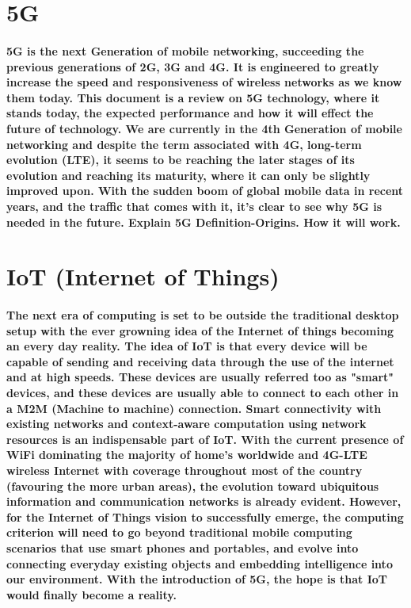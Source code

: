 \section{5G}
\paragraph{5G is the next Generation of mobile networking, succeeding the previous generations of 2G, 3G and 4G. It is engineered to greatly increase the speed and responsiveness of wireless networks as we know them today. This document is a review on 5G technology, where it stands today, the expected performance and how it will effect the future of technology. We are currently in the 4th Generation of mobile networking and despite the term associated with 4G, long-term evolution (LTE), it seems to be reaching the later stages of its evolution and reaching its maturity, where it can only be slightly improved upon. With the sudden boom of global mobile data in recent years, and the traffic that comes with it, it's clear to see why 5G is needed in the future.  Explain 5G Definition-Origins. How it will work.}

\section{IoT (Internet of Things)}
\paragraph{The next era of computing is set to be outside the traditional desktop setup with the ever growning idea of the Internet of things becoming an every day reality. The idea of IoT is that every device will be capable of sending and receiving data through the use of the internet and at high speeds. These devices are usually referred too as "smart" devices, and these devices are usually able to connect to each other in a M2M (Machine to machine) connection.
Smart connectivity  with  existing  networks  and  context-aware computation using network resources is an indispensable  part of IoT. With the current presence of WiFi dominating the majority of home's worldwide and 4G-LTE wireless Internet with coverage throughout most of the country (favouring the more urban areas), the evolution toward ubiquitous information and communication networks is already evident. However, for the Internet of Things vision to successfully emerge, the computing criterion will need to go beyond traditional mobile computing scenarios that use smart phones and  portables, and evolve into connecting everyday existing objects and embedding intelligence into our environment. With the introduction of 5G, the hope is that IoT would finally become a reality.}